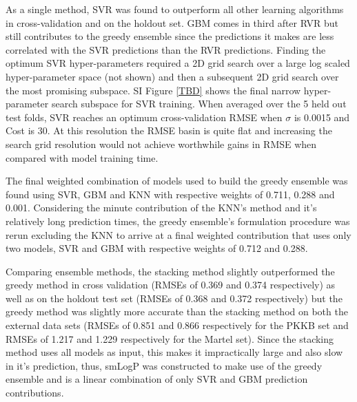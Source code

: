 \documentclass[10pt]{bmc_article}
\newenvironment{bmcformat}{\begin{raggedright}\baselineskip20pt\sloppy\setboolean{publ}{false}}{\end{raggedright}\baselineskip20pt\sloppy}
\begin{document}
\begin{bmcformat}
As a single method, SVR was found to outperform all other learning algorithms in cross-validation and on the holdout set. GBM comes in third after RVR but still contributes to the greedy ensemble since the predictions it makes are less correlated with the SVR predictions than the RVR predictions. Finding the optimum SVR hyper-parameters required a 2D grid search over a large log scaled hyper-parameter space (not shown) and then a subsequent 2D grid search over the most promising subspace. SI Figure \ref{TBD} shows the final narrow hyper-parameter search subspace for SVR training. When averaged over the 5 held out test folds, SVR reaches an optimum cross-validation RMSE when $\sigma$ is 0.0015 and Cost is 30. At this resolution the RMSE basin is quite flat and increasing the search grid resolution would not achieve worthwhile gains in RMSE when compared with model training time. 

The final weighted combination of models used to build the greedy ensemble was found using SVR, GBM and KNN with respective weights of 0.711, 0.288 and 0.001. Considering the minute contribution of the KNN's method and it's relatively long prediction times, the greedy ensemble's formulation procedure was rerun excluding the KNN to arrive at a final weighted contribution that uses only two models, SVR and GBM with respective weights of 0.712 and 0.288.

Comparing ensemble methods, the stacking method slightly outperformed the greedy method in cross validation (RMSEs of 0.369 and 0.374 respectively) as well as on the holdout test set (RMSEs of 0.368 and 0.372 respectively) but the greedy method was slightly more accurate than the stacking method on both the external data sets (RMSEs of 0.851 and 0.866 respectively for the PKKB set and RMSEs of 1.217 and 1.229 respectively for the Martel set). Since the stacking method uses all models as input, this makes it impractically large and also slow in it's prediction, thus, smLogP was constructed to make use of the greedy ensemble and is a linear combination of only SVR and GBM prediction contributions.


\end{bmcformat}
\end{document}
